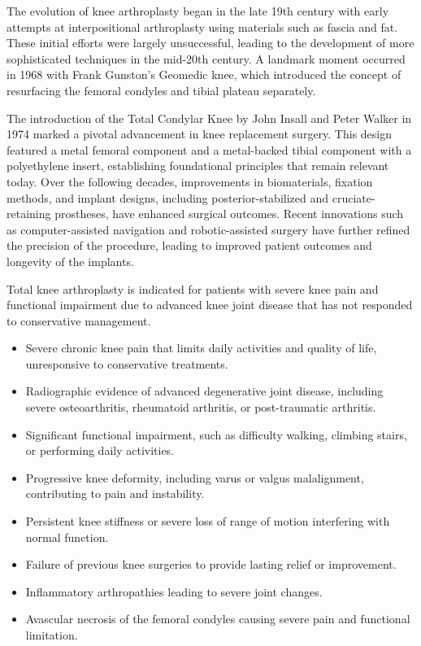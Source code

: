 The evolution of knee arthroplasty began in the late 19th century with early attempts at interpositional arthroplasty using materials such as fascia and fat. These initial efforts were largely unsuccessful, leading to the development of more sophisticated techniques in the mid-20th century. A landmark moment occurred in 1968 with Frank Gunston's Geomedic knee, which introduced the concept of resurfacing the femoral condyles and tibial plateau separately.

The introduction of the Total Condylar Knee by John Insall and Peter Walker in 1974 marked a pivotal advancement in knee replacement surgery. This design featured a metal femoral component and a metal-backed tibial component with a polyethylene insert, establishing foundational principles that remain relevant today. Over the following decades, improvements in biomaterials, fixation methods, and implant designs, including posterior-stabilized and cruciate-retaining prostheses, have enhanced surgical outcomes. Recent innovations such as computer-assisted navigation and robotic-assisted surgery have further refined the precision of the procedure, leading to improved patient outcomes and longevity of the implants.

Total knee arthroplasty is indicated for patients with severe knee pain and functional impairment due to advanced knee joint disease that has not responded to conservative management.

\begin{itemize}
  \item Severe chronic knee pain that limits daily activities and quality of life, unresponsive to conservative treatments.
  \item Radiographic evidence of advanced degenerative joint disease, including severe osteoarthritis, rheumatoid arthritis, or post-traumatic arthritis.
  \item Significant functional impairment, such as difficulty walking, climbing stairs, or performing daily activities.
  \item Progressive knee deformity, including varus or valgus malalignment, contributing to pain and instability.
  \item Persistent knee stiffness or severe loss of range of motion interfering with normal function.
  \item Failure of previous knee surgeries to provide lasting relief or improvement.
  \item Inflammatory arthropathies leading to severe joint changes.
  \item Avascular necrosis of the femoral condyles causing severe pain and functional limitation.
\end{itemize}

